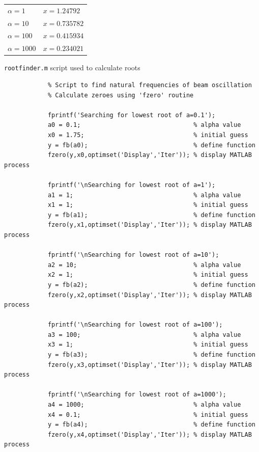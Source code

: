 \documentclass[11pt]{article}
\begin{document}
\begin{enumerate}
\begin{enumerate}[(a)]
\begin{tabular}{ll}
				$\alpha = 1$ & $x = 1.24792$ \\

				$\alpha = 10$ & $x = 0.735782$ \\

				$\alpha = 100$ & $x = 0.415934$ \\

				$\alpha = 1000$ & $x = 0.234021$ \\
			\end{tabular}

			\newpage
			\begin{center}
				\texttt{rootfinder.m} script used to calculate roots
			\end{center}

			\begin{verbatim}
			% Script to find natural frequencies of beam oscillation
			% Calculate zeroes using 'fzero' routine

			fprintf('Searching for lowest root of a=0.1');
			a0 = 0.1;                               % alpha value
			x0 = 1.75;                              % initial guess
			y = fb(a0);                             % define function
			fzero(y,x0,optimset('Display','Iter')); % display MATLAB process

			fprintf('\nSearching for lowest root of a=1');
			a1 = 1;                                 % alpha value
			x1 = 1;                                 % initial guess
			y = fb(a1);                             % define function
			fzero(y,x1,optimset('Display','Iter')); % display MATLAB process

			fprintf('\nSearching for lowest root of a=10');
			a2 = 10;                                % alpha value
			x2 = 1;                                 % initial guess
			y = fb(a2);                             % define function
			fzero(y,x2,optimset('Display','Iter')); % display MATLAB process

			fprintf('\nSearching for lowest root of a=100');
			a3 = 100;                               % alpha value
			x3 = 1;                                 % initial guess
			y = fb(a3);                             % define function
			fzero(y,x3,optimset('Display','Iter')); % display MATLAB process

			fprintf('\nSearching for lowest root of a=1000');
			a4 = 1000;                              % alpha value
			x4 = 0.1;                               % initial guess
			y = fb(a4);                             % define function
			fzero(y,x4,optimset('Display','Iter')); % display MATLAB process
			\end{verbatim} \


\end{enumerate}
\end{enumerate}
\end{document}
